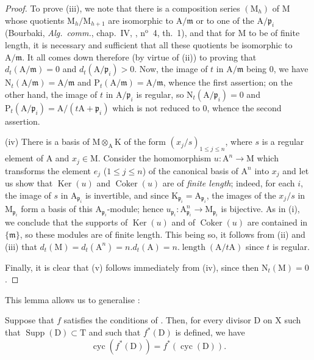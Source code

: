 \begin{proof}
To prove (iii), we note that there is a composition series $(\mathrm{M}_h)$ of $\mathrm{M}$ whose quotients $\mathrm{M}_h/\mathrm{M}_{h+1}$ are isomorphic to $\mathrm{A}/\mathfrak{m}$ or to one of the $\mathrm{A}/\mathfrak{p}_i$ (Bourbaki, \emph{Alg.\ comm.}, chap.~IV, , n$^{\mathrm{o}}$~4, th.~1), and that for $\mathrm{M}$ to be of finite length, it is necessary and sufficient that all these quotients be isomorphic to $\mathrm{A}/\mathfrak{m}$.
It all comes down therefore (by virtue of (ii)) to proving that $d_t(\mathrm{A}/\mathfrak{m})=0$ and $d_t(\mathrm{A}/\mathfrak{p}_i)>0$.
Now, the image of $t$ in $\mathrm{A}/\mathfrak{m}$ being $0$, we have $\mathrm{N}_t(\mathrm{A}/\mathfrak{m})=\mathrm{A}/\mathfrak{m}$ and $\mathrm{P}_t(\mathrm{A}/\mathfrak{m})=\mathrm{A}/\mathfrak{m}$, whence the first assertion; on the other hand, the image of $t$ in $\mathrm{A}/\mathfrak{p}_i$ is regular, so $\mathrm{N}_t(\mathrm{A}/\mathfrak{p}_i)=0$ and $\mathrm{P}_t(\mathrm{A}/\mathfrak{p}_i)=\mathrm{A}/(t\mathrm{A}+\mathfrak{p}_i)$ which is not reduced to $0$, whence the second assertion.

(iv) There is a basis of $\mathrm{M}\otimes_{\mathrm{A}}\mathrm{K}$ of the form $(x_j/s)_{1\leq j\leq n}$, where $s$ is a regular element of $\mathrm{A}$ and $x_j\in\mathrm{M}$.
Consider the homomorphism $u:\mathrm{A}^n\to\mathrm{M}$ which transforms the element $e_j$ ($1\leq j\leq n$) of the canonical basis of $\mathrm{A}^n$ into $x_j$ and let us show that $\operatorname{Ker}(u)$ and $\operatorname{Coker}(u)$ are of \emph{finite length}; indeed, for each $i$, the image of $s$ in $\mathrm{A}_{\mathfrak{p}_i}$ is invertible, and since $\mathrm{K}_{\mathfrak{p}_i}=\mathrm{A}_{\mathfrak{p}_i}$, the images of the $x_j/s$ in $\mathrm{M}_{\mathfrak{p}_i}$ form a basis of this $\mathrm{A}_{\mathfrak{p}_i}$-module; hence $u_{\mathfrak{p}_i}:\mathrm{A}_{\mathfrak{p}_i}^n\to\mathrm{M}_{\mathfrak{p}_i}$ is bijective.
As in (i), we conclude that the supports of $\operatorname{Ker}(u)$ and of $\operatorname{Coker}(u)$ are contained in $\{\mathfrak{m}\}$, so these modules are of finite length.
This being so, it follows from (ii) and (iii) that $d_t(\mathrm{M})=d_t(\mathrm{A}^n)=n. d_t(\mathrm{A})=n.\operatorname{length}(\mathrm{A}/t\mathrm{A})$ since $t$ is regular.

Finally, it is clear that (v) follows immediately from (iv), since then $\mathrm{N}_t(\mathrm{M})=0$.
\end{proof}

This lemma allows us to generalise :
\begin{proposition}[21.10.13]
\label{IV.21.10.13bis}
Suppose that $f$ satisfies the conditions of .
Then, for every divisor $\mathrm{D}$ on $\mathrm{X}$ such that $\operatorname{Supp}(\mathrm{D})\subset\mathrm{T}$ and such that $f^*(\mathrm{D})$ is defined, we have
\[
\label{IV.21.10.13.1}
  \operatorname{cyc}(f^*(\mathrm{D}))=f^*(\operatorname{cyc}(\mathrm{D})).
  \tag{21.10.13.1}
\]
\end{proposition}

